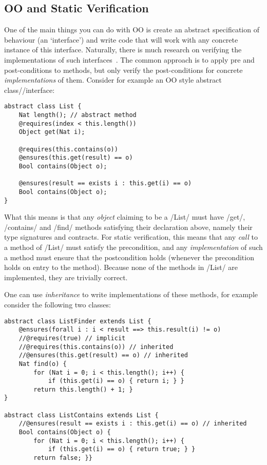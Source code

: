\subsection{OO and Static Verification}
One of the main things you can do with OO is create an abstract specification of behaviour (an `interface') and write code that will work with any concrete instance of this interface. Naturally, there is much research on verifying the implementations of such interfaces~\cite{Ahmadi:2015:AVD:2786536.2786542}. The common approach is to apply pre and post-conditions to methods, but only verify the post-conditions for concrete \emph{implementations} of them. Consider for example an OO style abstract class//interface:
\begin{lstlisting}
abstract class List {
	Nat length(); // abstract method
	@requires(index < this.length())
	Object get(Nat i);
	
	@requires(this.contains(o))
	@ensures(this.get(result) == o)
	Bool contains(Object o);
	
	@ensures(result == exists i : this.get(i) == o)
	Bool contains(Object o);
}
\end{lstlisting}
What this means is that any \emph{object} claiming to be a /List/ must have /get/, /contains/ and /find/ methods satisfying their declaration above, namely their type signatures and contracts. For static verification, this means that any \emph{call} to a method of /List/ must satisfy the precondition, and any \emph{implementation} of such a method must ensure that the postcondition holds (whenever the precondition holds on entry to the method). Because none of the methods in /List/ are implemented, they are trivially correct. 

One can use \emph{inheritance} to write implementations of these methods, for example consider the following two classes:
\begin{lstlisting}
abstract class ListFinder extends List {
	@ensures(forall i : i < result ==> this.result(i) != o)
	//@requires(true) // implicit
	//@requires(this.contains(o)) // inherited
	//@ensures(this.get(result) == o) // inherited
	Nat find(o) {
		for (Nat i = 0; i < this.length(); i++) {
			if (this.get(i) == o) { return i; } }
		return this.length() + 1; }
}

abstract class ListContains extends List {
	//@ensures(result == exists i : this.get(i) == o) // inherited
	Bool contains(Object o) {
		for (Nat i = 0; i < this.length(); i++) {
			if (this.get(i) == o) { return true; } }
		return false; }}
\end{lstlisting}

